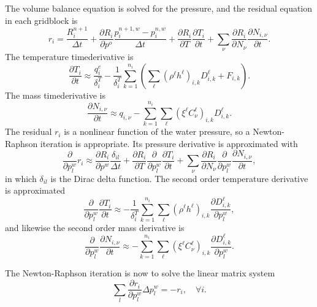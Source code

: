 The volume balance equation is solved for the pressure, and the
residual equation in each gridblock is
\begin{equation}
  r_i = \frac{R^{n+1}_i}{\Delta t} + \frac{\partial R_i}{\partial p^o}
  \frac{p_i^{n+1,w} - p_i^{n,w}}{\Delta t} +
  \frac{\partial R_i}{\partial T}\frac{\partial T_i}{\partial t} +
  \sum_\nu \frac{\partial R_i}{\partial N_\nu}
  \frac{\partial N_{i,\nu}}{\partial t}.
\end{equation}
The temperature timederivative is
\begin{equation}
  \frac{\partial T_i}{\partial t} \approx
  \frac{q_i^e}{\delta_i^T}-\frac{1}{\delta_i^T}
  \sum_{k=1}^{n_i} \left(\sum_\ell
    \left(\rho^\ell h^\ell\right)_{i,k}
    D_{i,k}^\ell + F_{i,k}
  \right).
\end{equation}
The mass timederivative is
\begin{equation}
  \frac{\partial N_{i,\nu}}{\partial t} \approx
  q_{i,\nu}-\sum_{k=1}^{n_i} \sum_\ell
  \left(\xi^\ell C_\nu^\ell\right)_{i,k} D_{i,k}^\ell.
\end{equation}
The residual $r_i$ is a nonlinear function of the water pressure, so a
Newton-Raphson iteration is appropriate. Its pressure derivative is
approximated with
\begin{equation}
  \frac{\partial}{\partial p_l^w} r_i \approx
  \frac{\partial R_i}{\partial p^w}
  \frac{\delta_{il}}{\Delta t} +
  \frac{\partial R_i}{\partial T}
  \frac{\partial}{\partial p_l^w} \frac{\partial T_i}{\partial t} +
  \sum_\nu \frac{\partial R_i}{\partial N_\nu}
  \frac{\partial}{\partial p_l^w} \frac{\partial N_{i,\nu}}{\partial t},
\end{equation}
in which $\delta_{il}$ is the Dirac delta function. The second order
temperature derivative is approximated
\begin{equation}
  \frac{\partial}{\partial p_l^w} \frac{\partial T_i}{\partial t} \approx
  -\frac{1}{\delta_i^T}
  \sum_{k=1}^{n_i} \sum_\ell
  \left(\rho^\ell h^\ell\right)_{i,k}
  \frac{\partial D_{i,k}^\ell}{\partial p_l^w},
\end{equation}
and likewise the second order mass derivative is
\begin{equation}
  \frac{\partial}{\partial p_l^w}
  \frac{\partial N_{i,\nu}}{\partial t} \approx
  -\sum_{k=1}^{n_i} \sum_\ell
  \left(\xi^\ell C_\nu^\ell\right)_{i,k}
  \frac{\partial D_{i,k}^\ell}{\partial p_l^w}.
\end{equation}

The Newton-Raphson iteration is now to solve the linear matrix system
\begin{equation}
  \sum_l \frac{\partial r_i}{\partial p_l^w} \Delta p_l^w =
  -r_i,\quad\forall i.
\end{equation}

